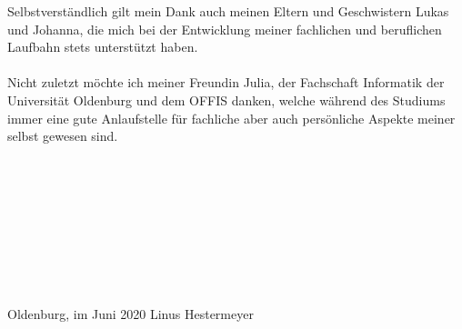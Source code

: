 \documentclass{article}
\begin{document}
Selbstverständlich gilt mein Dank auch meinen Eltern und Geschwistern Lukas und Johanna, die mich bei der Entwicklung meiner fachlichen und beruflichen Laufbahn stets unterstützt haben.\\\\
Nicht zuletzt möchte ich meiner Freundin Julia, der Fachschaft Informatik der Universität Oldenburg und dem OFFIS danken, welche während des Studiums immer eine gute Anlaufstelle für fachliche aber auch persönliche Aspekte meiner selbst gewesen sind.\\\\\\\\\\\\\\\\\\\\
Oldenburg, im Juni 2020 \hspace{9.7cm}Linus Hestermeyer
\clearpage
\thispagestyle{empty}
\tableofcontents
\thispagestyle{empty}
\clearpage

\clearpage


\clearpage


\end{document}
